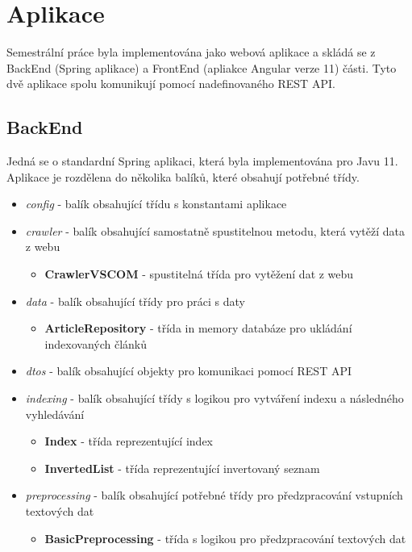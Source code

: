 \documentclass[
12pt,
a4paper,
pdftex,
czech,
titlepage
]{report}
\begin{document}
\chapter{Aplikace}
Semestrální práce byla implementována jako webová aplikace a skládá se z BackEnd (Spring aplikace) a FrontEnd (apliakce Angular verze 11) části. Tyto dvě aplikace spolu komunikují pomocí nadefinovaného REST API.
\section{BackEnd}
Jedná se o standardní Spring aplikaci, která byla implementována pro Javu 11. Aplikace je rozdělena do několika balíků, které obsahují potřebné třídy.
\begin{itemize}
    \item \textit{config} - balík obsahující třídu s konstantami aplikace
    \item \textit{crawler} - balík obsahující samostatně spustitelnou metodu, která vytěží data z webu
    \begin{itemize}
        \item \textbf{CrawlerVSCOM} - spustitelná třída pro vytěžení dat z webu
    \end{itemize}
    \item \textit{data} - balík obsahující třídy pro práci s daty
    \begin{itemize}
        \item \textbf{ArticleRepository} - třída in memory databáze pro ukládání indexovaných článků
    \end{itemize}
    \item \textit{dtos} - balík obsahující objekty pro komunikaci pomocí REST API
    \item \textit{indexing} - balík obsahující třídy s logikou pro vytváření indexu a následného vyhledávání
    \begin{itemize}
        \item \textbf{Index} - třída reprezentující index
        \item \textbf{InvertedList} - třída reprezentující invertovaný seznam
    \end{itemize}
    \item \textit{preprocessing} - balík obsahující potřebné třídy pro předzpracování vstupních textových dat
    \begin{itemize}
        \item \textbf{BasicPreprocessing} - třída s logikou pro předzpracování textových dat
    \end{itemize}

\end{itemize}
\end{document}

